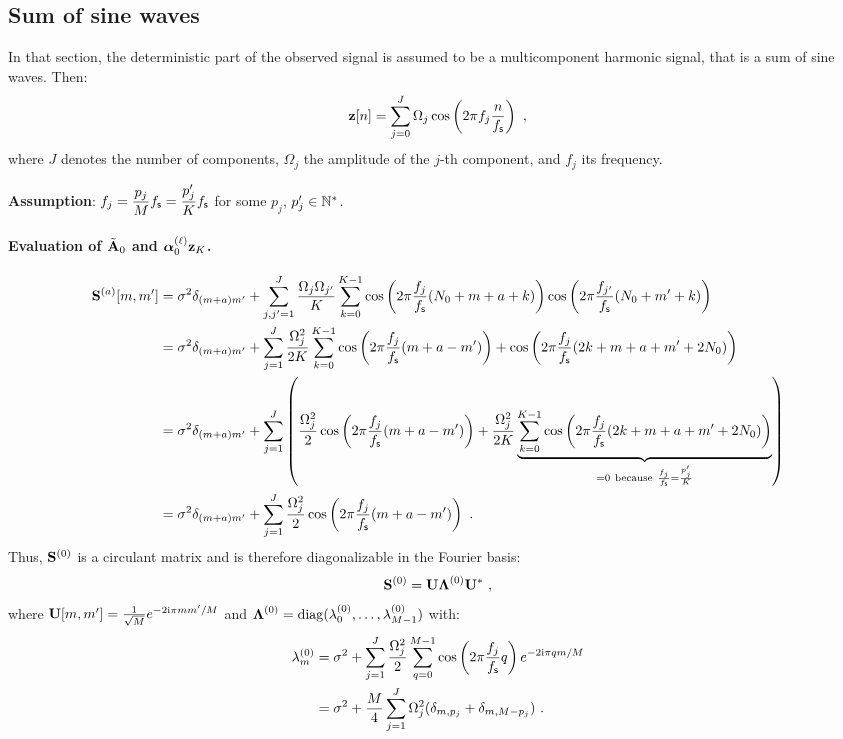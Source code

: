 \subsection{Sum of sine waves}

In that section, the deterministic part of the observed signal is assumed to be a multicomponent harmonic signal, that is a sum of sine waves. Then:
\[
{\mathbf z}[n]=\sum_{j=0}^J\Omega_j\cos\left(2\pi f_j \frac{n}{f_{\mathsf s}}\right)\ ,
\]
where $J$ denotes the number of components, $\Omega_j$ the amplitude of the $j$-th component, and $f_j$ its frequency.

{\bf Assumption}: $f_j = \dfrac{p_j}{M}f_{\mathsf s} = \dfrac{p'_j}{K}f_{\mathsf s}$ for some $p_j$, $p'_j\in\mathbb N^*$.

\paragraph{Evaluation of $\tilde{{\mathbf A}}_0$ and $\boldsymbol{\alpha}_0^{(\ell)}{\mathbf z}_K$.}
\begin{align*}
\bS^{(a)}[m,m'] &= \sigma^2\delta_{(m+a)m'}+\sum_{j,j'=1}^J\dfrac{\Omega_j\Omega_{j'}}{K}\sum_{k=0}^{K-1} \cos\left(2\pi \frac{f_j}{\fs}(N_0+m+a+k)\right)\cos\left(2\pi \frac{f_{j'}}{\fs}(N_0+m'+k)\right) \\
&= \sigma^2\delta_{(m+a)m'}+\sum_{j=1}^J\dfrac{\Omega_j^2}{2K}\sum_{k=0}^{K-1} \cos\left(2\pi \frac{f_j}{\fs}(m+a-m')\right) + \cos\left(2\pi \frac{f_j}{\fs}(2k+m+a+m'+2N_0)\right)\\
&= \sigma^2\delta_{(m+a)m'}+\sum_{j=1}^J\left( \dfrac{\Omega_j^2}2\cos\left(2\pi \frac{f_j}{\fs}(m+a-m')\right) + \dfrac{\Omega_j^2}{2K}\underbrace{\sum_{k=0}^{K-1}\cos\left(2\pi \frac{f_j}{\fs}(2k+m+a+m'+2N_0)\right)}_{=0\ \mathrm{because}\ \frac{f_j}\fs=\frac{p'_j}K } \right)\\
&= \sigma^2\delta_{(m+a)m'}+\sum_{j=1}^J\dfrac{\Omega_j^2}2\cos\left(2\pi \frac{f_j}{\fs}(m+a-m')\right)\ .
\end{align*}
Thus, ${\mathbf S}^{(0)}$ is a circulant matrix and is therefore diagonalizable in the Fourier basis:
\[
{\mathbf S}^{(0)} = {\mathbf U}\boldsymbol{\Lambda}^{(0)}{\mathbf U}^*\ ,
\]
where ${\mathbf U}[m,m']=\frac1{\sqrt{M}}e^{-2\mathrm{i}\pi mm'/M}$ and $\boldsymbol{\Lambda}^{(0)} = \mathrm{diag}(\lambda_0^{(0)},\dots,\lambda_{M-1}^{(0)})$ with:
\begin{align*}
\lambda_m^{(0)} &= \sigma^2 + \sum_{j=1}^J\dfrac{\Omega_j^2}2\sum_{q=0}^{M-1} \cos\left(2\pi\frac{f_j}{f_{\mathsf s}} q\right) e^{-2\mathrm{i}\pi qm/M} \\
&= \sigma^2 + \dfrac{M}{4}\sum_{j=1}^J\Omega_j^2(\delta_{m,p_j} + \delta_{m,M-p_j})\ .
\end{align*}
